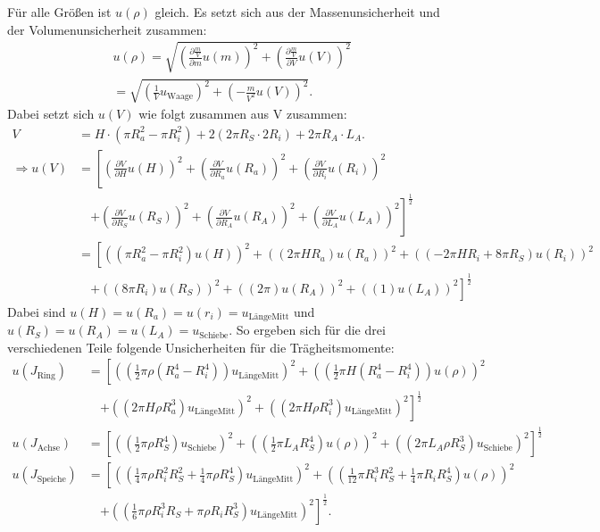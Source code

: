 \documentclass[11pt,a4paper,titlepage, ngerman]{article}
\begin{document}
	Für alle Größen ist $u(\rho)$ gleich. Es setzt sich aus der Massenunsicherheit und der Volumenunsicherheit zusammen:
	\begin{align*}
		u(\rho) = \sqrt{\left( \frac{\partial \frac{m}{V}}{\partial m}u(m)\right)^2 + \left( \frac{\partial \frac{m}{V}}{\partial V}u(V)\right)^2} \\
			= \sqrt{\left(\frac{1}{V}u_\text{Waage}\right)^2 + \left(- \frac{m}{V^2}u(V)\right)^2}. 
	\end{align*}
	Dabei setzt sich $u(V)$ wie folgt zusammen aus V zusammen:
	\begin{align*}
		V &= H\cdot(\pi R_a^2 - \pi R_i^2) + 2(2\pi R_S\cdot 2 R_i) + 2\pi R_A\cdot L_A. \\		
		\Rightarrow u(V) &= \left[\left( \frac{\partial V}{\partial H}u(H)\right)^2 
			+ \left( \frac{\partial V}{\partial R_a}u(R_a)\right)^2 
			+ \left( \frac{\partial V}{\partial R_i}u(R_i)\right)^2 \right.\\ 
			&\quad\left.+ \left( \frac{\partial V}{\partial R_S}u(R_S)\right)^2 
			+ \left( \frac{\partial V}{\partial R_A}u(R_A)\right)^2 
			+ \left( \frac{\partial V}{\partial L_A}u(L_A)\right)^2\right]^{\frac{1}{2}} \\		
		&= \left[\left( (\pi R_a^2 - \pi R_i^2)u(H)\right)^2 
			+ \left( (2\pi H R_a)u(R_a)\right)^2 
			+ \left( (-2\pi H R_i+8\pi R_S)u(R_i)\right)^2 \right.\\ 
			&\quad\left.+ \left( (8\pi R_i)u(R_S)\right)^2 
			+ \left( (2\pi)u(R_A)\right)^2 
			+ \left( (1)u(L_A)\right)^2\right]^{\frac{1}{2}}		
	\end{align*}
	Dabei sind $u(H)=u(R_a)=u(r_i)=u_\text{LängeMitt}$ und $u(R_S)=u(R_A)=u(L_A)=u_\text{Schiebe}$.
	So ergeben sich für die drei verschiedenen Teile folgende Unsicherheiten für die Trägheitsmomente:
	\begin{align*}
	u(J_\text{Ring}) &= 
	\left[\left( (\frac{1}{2}\pi\rho (R_a^4 - R_i^4))u_\text{LängeMitt}\right)^2  				
		+ \left( (\frac{1}{2}\pi H (R_a^4 - R_i^4))u(\rho)\right)^2 \right.\\ 
		&\quad\left.+ \left( (2\pi H \rho R_a^3)u_\text{LängeMitt}\right)^2
		+ \left( (2\pi H \rho R_i^3)u_\text{LängeMitt}\right)^2\right]^{\frac{1}{2}}\\
	u(J_\text{Achse}) &= 
	\left[\left( (\frac{1}{2}\pi\rho R_S^4)u_\text{Schiebe}\right)^2  				
		+ \left( (\frac{1}{2}\pi L_A R_S^4)u(\rho)\right)^2  
		+ \left( (2\pi L_A \rho R_S^3)u_\text{Schiebe}\right)^2\right]^{\frac{1}{2}}\\
	u(J_\text{Speiche}) &= 
	\left[\left( (\frac{1}{4}\pi\rho R_i^2 R_S^2+\frac{1}{4}\pi\rho R_S^4)u_\text{LängeMitt}\right)^2  				
		+ \left( (\frac{1}{12}\pi R_i^3 R_S^2 + \frac{1}{4}\pi R_i R_S^4)u(\rho)\right)^2\right. \\ 
		&\quad\left.+ \left( (\frac{1}{6}\pi \rho R_i^3 R_S + \pi \rho R_i R_S^3)u_\text{LängeMitt}\right)^2\right]^{\frac{1}{2}}.	  
	\end{align*}
\end{document}
